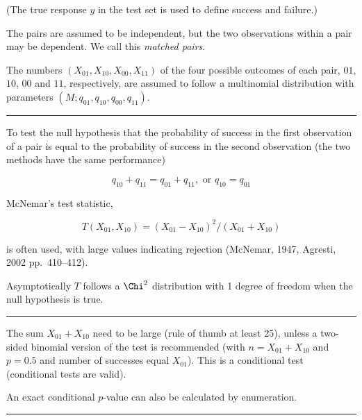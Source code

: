 \documentclass[
  letterpaper,
  DIV=11,
  numbers=noendperiod]{scrartcl}
\newenvironment{Shaded}{\begin{snugshade}}{\end{snugshade}}
\newcommand{\FunctionTok}[1]{\textcolor[rgb]{0.28,0.35,0.67}{#1}}
\newcommand{\NormalTok}[1]{\textcolor[rgb]{0.00,0.23,0.31}{#1}}
\newcommand{\OtherTok}[1]{\textcolor[rgb]{0.00,0.23,0.31}{#1}}
\newcommand{\SpecialCharTok}[1]{\textcolor[rgb]{0.37,0.37,0.37}{#1}}
\begin{document}
(The true response \(y\) in the test set is used to define success and
failure.)

The pairs are assumed to be independent, but the two observations within
a pair may be dependent. We call this \emph{matched pairs}.

The numbers \((X_{01},X_{10},X_{00},X_{11})\) of the four possible
outcomes of each pair, \(01\), \(10\), \(00\) and \(11\), respectively,
are assumed to follow a multinomial distribution with parameters
\((M;q_{01},q_{10},q_{00},q_{11})\).

\begin{center}\rule{0.5\linewidth}{0.5pt}\end{center}

To test the null hypothesis that the probability of success in the first
observation of a pair is equal to the probability of success in the
second observation (the two methods have the same performance)

\[q_{10}+q_{11}=q_{01}+q_{11}, \text{ or }q_{10}=q_{01}\]

McNemar's test statistic,

\[T(X_{01},X_{10})=(X_{01}-X_{10})^2/(X_{01}+X_{10})\]

is often used, with large values indicating rejection (McNemar, 1947,
Agresti, 2002 pp.~410--412).

Asymptotically \(T\) follows a \(\Chi^2\) distribution with 1 degree of
freedom when the null hypothesis is true.

\begin{center}\rule{0.5\linewidth}{0.5pt}\end{center}

The sum \(X_{01}+X_{10}\) need to be large (rule of thumb at least 25),
unless a two-sided binomial version of the test is recommended (with
\(n=X_{01}+X_{10}\) and \(p=0.5\) and number of successes equal
\(X_{01}\)). This is a conditional test (conditional tests are valid).

An exact conditional \(p\)-value can also be calculated by enumeration.

\begin{center}\rule{0.5\linewidth}{0.5pt}\end{center}

\footnotesize

\begin{Shaded}
\end{Shaded}
\end{document}
